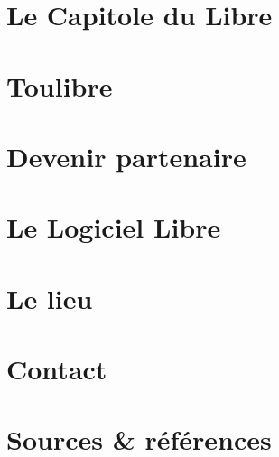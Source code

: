 \documentclass{cdl_sponsor}
\begin{document}

\section{Le Capitole du Libre}

	

\section{Toulibre}

	

\section{Devenir partenaire}

	

\section{Le Logiciel Libre}

	

\section{Le lieu}

	
	
\section{Contact}

	

\section{Sources \& références}

	
\end{document}
